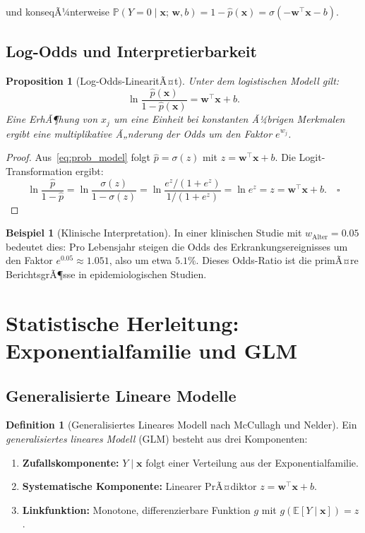 ﻿\documentclass[12pt, a4paper]{article}
\newtheorem{proposition}[theorem]{Proposition}
\theoremstyle{definition}
\newtheorem{definition}[theorem]{Definition}
\newtheorem{example}[theorem]{Beispiel}
\theoremstyle{remark}
\newcommand{\E}{\mathbb{E}}
\newcommand{\Prob}{\mathbb{P}}
\newcommand{\sigmoid}{\sigma}
\newcommand{\vw}{\bm{w}}
\newcommand{\vx}{\bm{x}}
\newcommand{\T}{\top}
\begin{document}
und konseqÃ¼nterweise $\Prob(Y=0 \mid \vx;\,\vw,b) = 1 - \hat{p}(\vx) = \sigmoid(-\vw^\T\vx - b)$.

\subsection{Log-Odds und Interpretierbarkeit}

\begin{proposition}[Log-Odds-LinearitÃ¤t]
  Unter dem logistischen Modell gilt:
  \begin{equation}
    \ln\frac{\hat{p}(\vx)}{1-\hat{p}(\vx)} = \vw^\T\vx + b.
    \label{eq:log_odds}
  \end{equation}
  Eine ErhÃ¶hung von $x_j$ um eine Einheit bei konstanten Ã¼brigen Merkmalen ergibt eine
  multiplikative Ã„nderung der Odds um den Faktor $e^{w_j}$.
\end{proposition}

\begin{proof}
  Aus~\eqref{eq:prob_model} folgt $\hat{p} = \sigmoid(z)$ mit $z = \vw^\T\vx+b$.
  Die Logit-Transformation ergibt:
  \[
    \ln\frac{\hat{p}}{1-\hat{p}} = \ln\frac{\sigmoid(z)}{1-\sigmoid(z)}
    = \ln\frac{e^z/(1+e^z)}{1/(1+e^z)} = \ln e^z = z = \vw^\T\vx+b. \quad \square
  \]
\end{proof}

\begin{example}[Klinische Interpretation]
  In einer klinischen Studie mit $w_{\text{Alter}} = 0.05$ bedeutet dies: Pro Lebensjahr
  steigen die Odds des Erkrankungsereignisses um den Faktor $e^{0.05} \approx 1.051$, also um
  etwa $5.1\%$. Dieses Odds-Ratio ist die primÃ¤re BerichtsgrÃ¶sse in epidemiologischen Studien.
\end{example}

\section{Statistische Herleitung: Exponentialfamilie und GLM}

\subsection{Generalisierte Lineare Modelle}

\begin{definition}[Generalisiertes Lineares Modell nach McCullagh und Nelder]
  Ein \emph{generalisiertes lineares Modell} (GLM) besteht aus drei Komponenten:
  \begin{enumerate}[label=(\roman*)]
    \item \textbf{Zufallskomponente:} $Y \mid \vx$ folgt einer Verteilung aus der Exponentialfamilie.
    \item \textbf{Systematische Komponente:} Linearer PrÃ¤diktor $z = \vw^\T\vx + b$.
    \item \textbf{Linkfunktion:} Monotone, differenzierbare Funktion $g$ mit $g(\E[Y\mid\vx]) = z$.
  \end{enumerate}
\end{definition}
\end{document}
